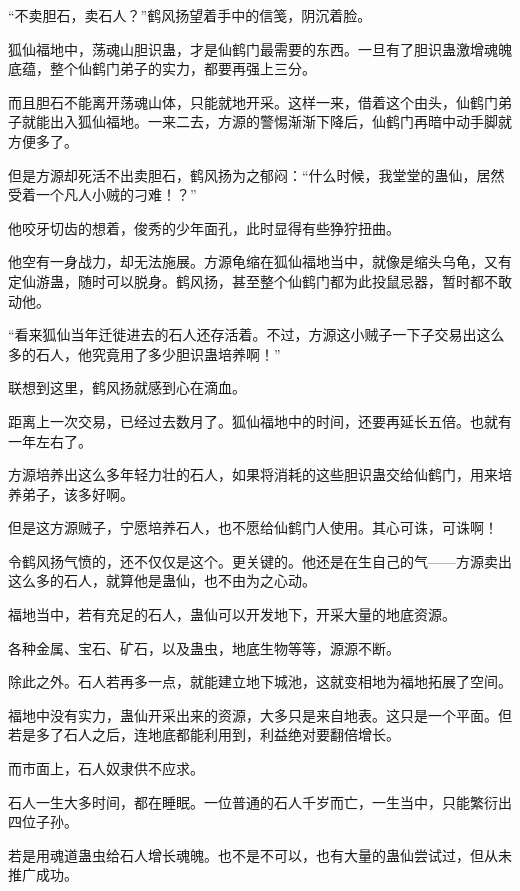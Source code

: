 
\begin{this_body}

“不卖胆石，卖石人？”鹤风扬望着手中的信笺，阴沉着脸。

狐仙福地中，荡魂山胆识蛊，才是仙鹤门最需要的东西。一旦有了胆识蛊激增魂魄底蕴，整个仙鹤门弟子的实力，都要再强上三分。

而且胆石不能离开荡魂山体，只能就地开采。这样一来，借着这个由头，仙鹤门弟子就能出入狐仙福地。一来二去，方源的警惕渐渐下降后，仙鹤门再暗中动手脚就方便多了。

但是方源却死活不出卖胆石，鹤风扬为之郁闷：“什么时候，我堂堂的蛊仙，居然受着一个凡人小贼的刁难！？”

他咬牙切齿的想着，俊秀的少年面孔，此时显得有些狰狞扭曲。

他空有一身战力，却无法施展。方源龟缩在狐仙福地当中，就像是缩头乌龟，又有定仙游蛊，随时可以脱身。鹤风扬，甚至整个仙鹤门都为此投鼠忌器，暂时都不敢动他。

“看来狐仙当年迁徙进去的石人还存活着。不过，方源这小贼子一下子交易出这么多的石人，他究竟用了多少胆识蛊培养啊！”

联想到这里，鹤风扬就感到心在滴血。

距离上一次交易，已经过去数月了。狐仙福地中的时间，还要再延长五倍。也就有一年左右了。

方源培养出这么多年轻力壮的石人，如果将消耗的这些胆识蛊交给仙鹤门，用来培养弟子，该多好啊。

但是这方源贼子，宁愿培养石人，也不愿给仙鹤门人使用。其心可诛，可诛啊！

令鹤风扬气愤的，还不仅仅是这个。更关键的。他还是在生自己的气——方源卖出这么多的石人，就算他是蛊仙，也不由为之心动。

福地当中，若有充足的石人，蛊仙可以开发地下，开采大量的地底资源。

各种金属、宝石、矿石，以及蛊虫，地底生物等等，源源不断。

除此之外。石人若再多一点，就能建立地下城池，这就变相地为福地拓展了空间。

福地中没有实力，蛊仙开采出来的资源，大多只是来自地表。这只是一个平面。但若是多了石人之后，连地底都能利用到，利益绝对要翻倍增长。

而市面上，石人奴隶供不应求。

石人一生大多时间，都在睡眠。一位普通的石人千岁而亡，一生当中，只能繁衍出四位子孙。

若是用魂道蛊虫给石人增长魂魄。也不是不可以，也有大量的蛊仙尝试过，但从未推广成功。


\end{this_body}
